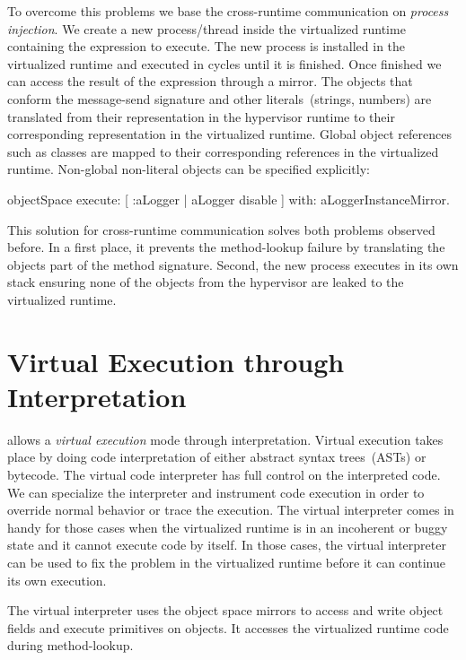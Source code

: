 To overcome this problems we base the cross-runtime communication on \emph{process injection}. We create a new process/thread inside the virtualized runtime containing the expression to execute. The new process is installed in the virtualized runtime and executed in cycles until it is finished. Once finished we can access the result of the expression through a mirror. The objects that conform the message-send signature and other literals~(\eg strings, numbers) are translated from their representation in the hypervisor runtime to their corresponding representation in the virtualized runtime. Global object references such as classes are mapped to their corresponding references in the virtualized runtime. Non-global non-literal objects can be specified explicitly:

\begin{code}
objectSpace
	execute: [ :aLogger | aLogger disable ]
	with: aLoggerInstanceMirror.
\end{code}

This solution for cross-runtime communication solves both problems observed before. In a first place, it prevents the method-lookup failure by translating the objects part of the method signature. Second, the new process executes in its own stack ensuring none of the objects from the hypervisor are leaked to the virtualized runtime.

\section{Virtual Execution through Interpretation} \label{sec:interpretation}

\Vtt allows a \emph{virtual execution} mode through interpretation. Virtual execution takes place by doing code interpretation of either abstract syntax trees~(ASTs) or bytecode. The virtual code interpreter has full control on the interpreted code. We can specialize the interpreter and instrument code execution in order to override normal behavior or trace the execution. The virtual interpreter comes in handy for those cases when the virtualized runtime is in an incoherent or buggy state and it cannot execute code by itself. In those cases, the virtual interpreter can be used to fix the problem in the virtualized runtime before it can continue its own execution.

The virtual interpreter uses the object space mirrors to access and write object fields and execute primitives on objects. It accesses the virtualized runtime code during method-lookup.

